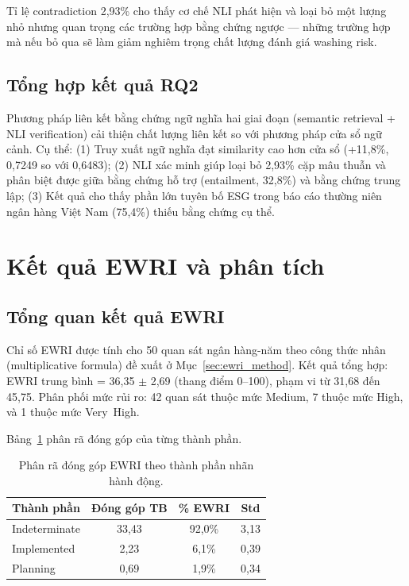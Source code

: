 Tỉ lệ contradiction 2,93\% cho thấy cơ chế NLI phát hiện và loại bỏ một lượng nhỏ nhưng quan trọng các trường hợp bằng chứng ngược --- những trường hợp mà nếu bỏ qua sẽ làm giảm nghiêm trọng chất lượng đánh giá washing risk.


\subsection{Tổng hợp kết quả RQ2}
\label{subsec:rq2_answer}

\begin{tcolorbox}[colback=gray!5, colframe=gray!60, title=Trả lời RQ2]
Phương pháp liên kết bằng chứng ngữ nghĩa hai giai đoạn (semantic retrieval + NLI verification) cải thiện chất lượng liên kết so với phương pháp cửa sổ ngữ cảnh. Cụ thể: (1) Truy xuất ngữ nghĩa đạt similarity cao hơn cửa sổ (+11,8\%, 0,7249 so với 0,6483); (2) NLI xác minh giúp loại bỏ 2,93\% cặp mâu thuẫn và phân biệt được giữa bằng chứng hỗ trợ (entailment, 32,8\%) và bằng chứng trung lập; (3) Kết quả cho thấy phần lớn tuyên bố ESG trong báo cáo thường niên ngân hàng Việt Nam (75,4\%) thiếu bằng chứng cụ thể.
\end{tcolorbox}


\section{Kết quả EWRI và phân tích}
\label{sec:ewri_results}

\subsection{Tổng quan kết quả EWRI}
\label{subsec:ewri_overview}

Chỉ số EWRI được tính cho 50 quan sát ngân hàng-năm theo công thức nhân (multiplicative formula) đề xuất ở Mục~\ref{sec:ewri_method}. Kết quả tổng hợp: EWRI trung bình = 36,35 $\pm$ 2,69 (thang điểm 0--100), phạm vi từ 31,68 đến 45,75. Phân phối mức rủi ro: 42 quan sát thuộc mức Medium, 7 thuộc mức High, và 1 thuộc mức Very~High.

Bảng~\ref{tab:ewri_decomposition} phân rã đóng góp của từng thành phần.

\begin{table}[H]
\centering
\caption{Phân rã đóng góp EWRI theo thành phần nhãn hành động.}
\label{tab:ewri_decomposition}
\begin{tabular}{lccc}
\toprule
\textbf{Thành phần} & \textbf{Đóng góp TB} & \textbf{\% EWRI} & \textbf{Std} \\
\midrule
Indeterminate & 33,43 & 92,0\% & 3,13 \\
Implemented   &  2,23 &  6,1\% & 0,39 \\
Planning      &  0,69 &  1,9\% & 0,34 \\
\bottomrule
\end{tabular}
\end{table}

